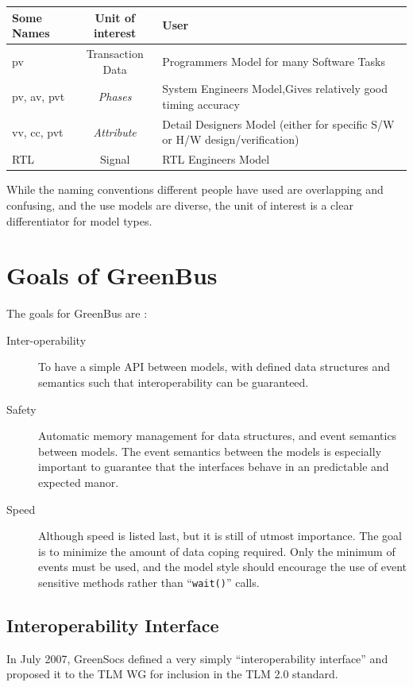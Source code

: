 \documentclass[12pt,oneside]{gsbook}
\newcommand{\atoms}{{\em Phases}\xspace}
\newcommand{\quark}{{\em Attribute}\xspace}
\begin{document}
\begin{tabular}{l|c|p{6cm}}
{\bf Some Names}&{Unit of interest}&{User}\\
\hline
pv & Transaction Data & Programmers Model for many Software Tasks \\
pv, av, pvt &  \atoms & System Engineers Model,Gives relatively good timing accuracy\\
vv, cc, pvt & \quark & Detail Designers Model (either for specific S/W or H/W design/verification)\\
RTL & 	Signal &  RTL Engineers Model\\
\end{tabular}

While the naming conventions different people have used are
overlapping and confusing, and the use models are diverse, the unit of
interest is a clear differentiator for model types.

\chapter{Goals of GreenBus}

The goals for GreenBus are :
\begin{description}
\item[Inter-operability] To have a simple API between models, with
defined  data structures and semantics such that interoperability can
be guaranteed.

\item [Safety] Automatic memory management for data structures, and
event semantics between models. The event semantics between the models
is especially important to guarantee that the interfaces behave in an
predictable and expected manor.

\item [Speed] Although speed is listed last, but it is still of utmost
importance. The goal is to minimize the amount
of data coping required. Only the minimum of events must be used, and
the model style should encourage the use of event sensitive methods
rather than ``{\tt wait()}'' calls.
\end{description}

\section{Interoperability Interface}
\label{INTEROP}

In July 2007, GreenSocs defined a very simply ``interoperability interface''
and proposed it  to the TLM WG for inclusion in the TLM 2.0
standard.
\end{document}
